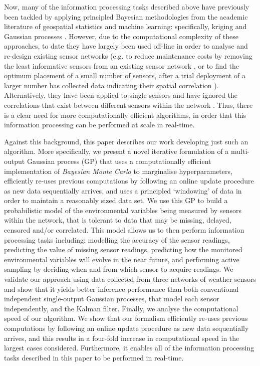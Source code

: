 \documentclass{acmsmall}
\begin{document}
Now, many of the information processing tasks described above have previously been tackled by applying principled Bayesian methodologies from the academic literature of geospatial statistics and machine learning: specifically, kriging \cite{cressie} and Gaussian processes \cite{GPsBook}. However, due to the computational complexity of these approaches, to date they have largely been used off-line in order to analyse and re-design existing sensor networks (e.g. to reduce maintenance costs by removing the least informative sensors from an existing sensor network \cite{fuentes}, or to find the optimum placement of a small number of sensors, after a trial deployment of a larger number has collected data indicating their spatial correlation \cite{guestrin1}). Alternatively, they have been applied to single sensors and have ignored the correlations that exist between different sensors within the network \cite{1525857,usac}. Thus, there is a clear need for more computationally efficient algorithms, in order that this information processing can be performed at scale in real-time.

Against this background, this paper describes our work developing just such an algorithm. More specifically, we present a novel iterative formulation of a multi-output Gaussian process (GP) that uses a computationally efficient implementation of {\em Bayesian Monte Carlo} to marginalise hyperparameters, efficiently re-uses previous computations by following an online update procedure as new data sequentially arrives, and uses a principled `windowing' of data in order to maintain a reasonably sized data set. We use this GP to build a probabilistic model of the environmental variables being measured by sensors within the network, that is tolerant to data that may be missing, delayed, censored and/or correlated. This model allows us to then perform information processing tasks including: modelling the accuracy of the sensor readings, predicting the value of missing sensor readings, predicting how the monitored environmental variables will evolve in the near future, and performing active sampling by deciding when and from which sensor to acquire readings. We validate our approach using data collected from three networks of weather sensors and show that it yields better inference performance than both conventional independent single-output Gaussian processes, that model each sensor independently, and the Kalman filter. Finally, we analyse the computational speed of our algorithm. We show that our formalism efficiently re-uses previous computations by following an online update procedure as new data sequentially arrives, and this results in a four-fold increase in computational speed in the largest cases considered. Furthermore, it enables all of the information processing tasks described in this paper to be performed in real-time.
\end{document}
